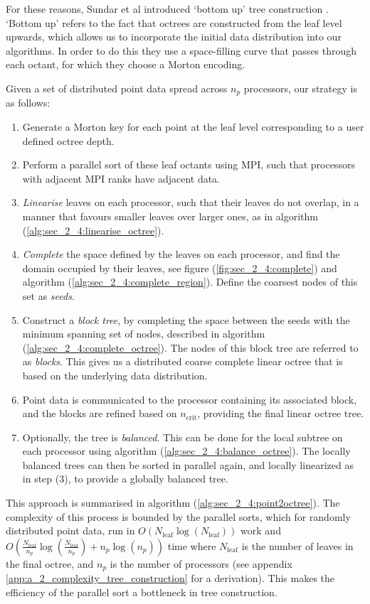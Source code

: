 For these reasons, Sundar et al introduced `bottom up' tree construction \cite{sundar2008bottom}. `Bottom up' refers to the fact that octrees are constructed from the leaf level upwards, which allows us to incorporate the initial data distribution into our algorithms. In order to do this they use a space-filling curve that passes through each octant, for which they choose a Morton encoding.

Given a set of distributed point data spread across $n_p$ processors, our strategy is as follows:

\begin{enumerate}
    \item Generate a Morton key for each point at the leaf level corresponding to a user defined octree depth.
    \item Perform a parallel sort of these leaf octants using MPI, such that processors with adjacent MPI ranks have adjacent data.
    \item \textit{Linearise} leaves on each processor, such that their leaves do not overlap, in a manner that favours smaller leaves over larger ones, as in algorithm (\ref{alg:sec_2_4:linearise_octree}). 
    \item \textit{Complete} the space defined by the leaves on each processor, and find the domain occupied by their leaves, see figure (\ref{fig:sec_2_4:complete}) and algorithm (\ref{alg:sec_2_4:complete_region}). Define the coarsest nodes of this set as \textit{seeds}.
    \item Construct a \textit{block tree}, by completing the space between the seeds with the minimum spanning set of nodes, described in algorithm (\ref{alg:sec_2_4:complete_octree}). The nodes of this block tree are referred to as \textit{blocks}. This gives us a distributed coarse complete linear octree that is based on the underlying data distribution.
    \item Point data is communicated to the processor containing its associated block, and the blocks are refined based on $n_{\text{crit}}$, providing the final linear octree tree.
    \item Optionally, the tree is \textit{balanced}. This can be done for the local subtree on each processor using algorithm (\ref{alg:sec_2_4:balance_octree}). The locally balanced trees can then be sorted in parallel again, and locally linearized as in step (3), to provide a globally balanced tree.
\end{enumerate}

This approach is summarised in algorithm (\ref{alg:sec_2_4:point2octree}). The complexity of this process is bounded by the parallel sorts, which for randomly distributed point data, run in $O(N_{\text{leaf}} \log (N_{\text{leaf}}))$ work and $O(\frac{N_{\text{leaf}}}{n_p} \log(\frac{N_{\text{leaf}}}{n_p}) + n_p \log (n_p))$ time where $N_{\text{leaf}}$ is the number of leaves in the final octree, and $n_p$ is the number of processors (see appendix \ref{app:a_2_complexity_tree_construction} for a derivation). This makes the efficiency of the parallel sort a bottleneck in tree construction.

